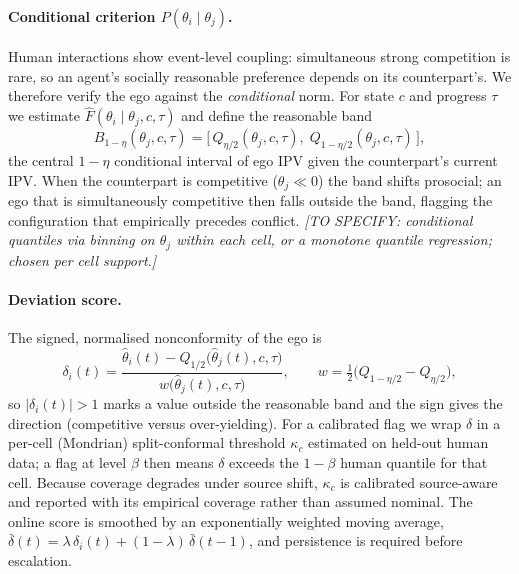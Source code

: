 \documentclass[12pt,a4paper]{article}
\begin{document}
\paragraph{Conditional criterion $P(\theta_i\mid\theta_j)$.}
Human interactions show event-level coupling: simultaneous strong competition is rare, so an
agent's socially reasonable preference depends on its counterpart's. We therefore verify the
ego against the \emph{conditional} norm. For state $c$ and progress $\tau$ we estimate
$\hat F(\theta_i\mid\theta_j,c,\tau)$ and define the reasonable band
\begin{equation}
B_{1-\eta}(\theta_j,c,\tau)=\bigl[\,Q_{\eta/2}(\theta_j,c,\tau),\;Q_{1-\eta/2}(\theta_j,c,\tau)\,\bigr],
\end{equation}
the central $1-\eta$ conditional interval of ego IPV given the counterpart's current IPV.
When the counterpart is competitive ($\theta_j\ll0$) the band shifts prosocial; an ego that
is simultaneously competitive then falls outside the band, flagging the configuration that
empirically precedes conflict.
\emph{[TO SPECIFY: conditional quantiles via binning on $\theta_j$ within each cell, or a
monotone quantile regression; chosen per cell support.]}

\paragraph{Deviation score.}
The signed, normalised nonconformity of the ego is
\begin{equation}
\delta_i(t)=\frac{\hat\theta_i(t)-Q_{1/2}\!\bigl(\hat\theta_j(t),c,\tau\bigr)}
{w\!\bigl(\hat\theta_j(t),c,\tau\bigr)},
\qquad
w=\tfrac{1}{2}\bigl(Q_{1-\eta/2}-Q_{\eta/2}\bigr),
\end{equation}
so $|\delta_i(t)|>1$ marks a value outside the reasonable band and the sign gives the
direction (competitive versus over-yielding). For a calibrated flag we wrap $\delta$ in a
per-cell (Mondrian) split-conformal threshold $\kappa_c$ estimated on held-out human data; a
flag at level $\beta$ then means $\delta$ exceeds the $1-\beta$ human quantile for that cell.
Because coverage degrades under source shift, $\kappa_c$ is calibrated source-aware and
reported with its empirical coverage rather than assumed nominal. The online score is
smoothed by an exponentially weighted moving average,
$\bar\delta(t)=\lambda\,\delta_i(t)+(1-\lambda)\,\bar\delta(t-1)$, and persistence is required
before escalation.
\end{document}

